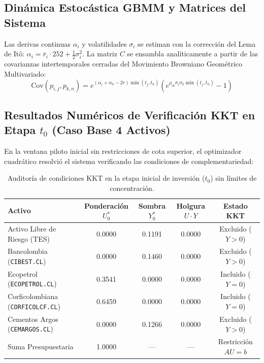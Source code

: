 \documentclass[11pt,a4paper]{article}
\begin{document}
\subsection{Dinámica Estocástica GBMM y Matrices del Sistema}
Las derivas continuas $\alpha_i$ y volatilidades $\sigma_i$ se estiman con la corrección del Lema de Itô: $\alpha_i = \bar{r}_i \cdot 252 + \frac{1}{2}\sigma_i^2$. La matriz $C$ se ensambla analíticamente a partir de las covarianzas intertemporales cerradas del Movimiento Browniano Geométrico Multivariado:
\begin{equation}
    \mathrm{Cov}(p_{i,j}, p_{k,n}) = e^{(\alpha_i + \alpha_k - 2r)\min(t_j, t_n)} \left( e^{\rho_{ik} \sigma_i \sigma_k \min(t_j, t_n)} - 1 \right)
\end{equation}

\subsection{Resultados Numéricos de Verificación KKT en Etapa \texorpdfstring{$t_0$}{t0} (Caso Base 4 Activos)}
En la ventana piloto inicial sin restricciones de cota superior, el optimizador cuadrático resolvió el sistema verificando las condiciones de complementariedad:

\begin{table}[htbp]
\centering
\footnotesize
\setlength{\tabcolsep}{5pt}
\begin{tabular}{lcccc}
\toprule
Activo & Ponderación $U_0^*$ & Sombra $Y_0^*$ & Holgura $U \cdot Y$ & Estado KKT \\
\midrule
Activo Libre de Riesgo (TES) & 0.0000 & 0.1191 & 0.0000 & Excluido ($Y > 0$) \\
Bancolombia (\texttt{CIBEST.CL}) & 0.0000 & 0.1460 & 0.0000 & Excluido ($Y > 0$) \\
Ecopetrol (\texttt{ECOPETROL.CL}) & 0.3541 & 0.0000 & 0.0000 & Incluido ($Y = 0$) \\
Corficolombiana (\texttt{CORFICOLCF.CL}) & 0.6459 & 0.0000 & 0.0000 & Incluido ($Y = 0$) \\
Cementos Argos (\texttt{CEMARGOS.CL}) & 0.0000 & 0.1266 & 0.0000 & Excluido ($Y > 0$) \\
\midrule
Suma Presupuestaria & 1.0000 & --- & --- & Restricción $AU=b$ \\
\bottomrule
\end{tabular}
\caption{Auditoría de condiciones KKT en la etapa inicial de inversión ($t_0$) sin límites de concentración.}
\end{table}
\end{document}
